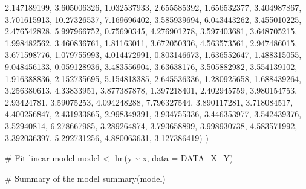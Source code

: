 \documentclass[
  11pt,
]{article}
\newenvironment{Shaded}{\begin{snugshade}}{\end{snugshade}}
\newcommand{\AttributeTok}[1]{\textcolor[rgb]{0.40,0.45,0.13}{#1}}
\newcommand{\CommentTok}[1]{\textcolor[rgb]{0.37,0.37,0.37}{#1}}
\newcommand{\FloatTok}[1]{\textcolor[rgb]{0.68,0.00,0.00}{#1}}
\newcommand{\FunctionTok}[1]{\textcolor[rgb]{0.28,0.35,0.67}{#1}}
\newcommand{\NormalTok}[1]{\textcolor[rgb]{0.00,0.23,0.31}{#1}}
\newcommand{\OtherTok}[1]{\textcolor[rgb]{0.00,0.23,0.31}{#1}}
\newcommand{\SpecialCharTok}[1]{\textcolor[rgb]{0.37,0.37,0.37}{#1}}
\begin{document}
\begin{Shaded}
\begin{Highlighting}[]
        \FloatTok{2.147189199}\NormalTok{, }\FloatTok{3.605006326}\NormalTok{, }\FloatTok{1.032537933}\NormalTok{, }\FloatTok{2.655585392}\NormalTok{, }\FloatTok{1.656532377}\NormalTok{, }\FloatTok{3.404987867}\NormalTok{,}
        \FloatTok{3.701615913}\NormalTok{, }\FloatTok{10.27326537}\NormalTok{, }\FloatTok{7.169696402}\NormalTok{, }\FloatTok{3.585939694}\NormalTok{, }\FloatTok{6.043443262}\NormalTok{, }\FloatTok{3.455010225}\NormalTok{,}
        \FloatTok{2.476542828}\NormalTok{, }\FloatTok{5.997966752}\NormalTok{, }\FloatTok{0.75690345}\NormalTok{, }\FloatTok{4.276901278}\NormalTok{, }\FloatTok{3.597403681}\NormalTok{, }\FloatTok{3.648705215}\NormalTok{,}
        \FloatTok{1.998482562}\NormalTok{, }\FloatTok{3.460836761}\NormalTok{, }\FloatTok{1.81163011}\NormalTok{, }\FloatTok{3.672050336}\NormalTok{, }\FloatTok{4.563573561}\NormalTok{, }\FloatTok{2.947486015}\NormalTok{,}
        \FloatTok{3.671598776}\NormalTok{, }\FloatTok{1.079755993}\NormalTok{, }\FloatTok{4.014472991}\NormalTok{, }\FloatTok{0.803146673}\NormalTok{, }\FloatTok{1.636552647}\NormalTok{, }\FloatTok{1.488315055}\NormalTok{,}
        \FloatTok{9.048456133}\NormalTok{, }\FloatTok{0.059128936}\NormalTok{, }\FloatTok{3.483556904}\NormalTok{, }\FloatTok{3.63638176}\NormalTok{, }\FloatTok{3.505882982}\NormalTok{, }\FloatTok{3.554139102}\NormalTok{,}
        \FloatTok{1.916388836}\NormalTok{, }\FloatTok{2.152735695}\NormalTok{, }\FloatTok{5.154818385}\NormalTok{, }\FloatTok{2.645536336}\NormalTok{, }\FloatTok{1.280925658}\NormalTok{, }\FloatTok{1.688439264}\NormalTok{,}
        \FloatTok{3.256380613}\NormalTok{, }\FloatTok{4.33833951}\NormalTok{, }\FloatTok{3.877387878}\NormalTok{, }\FloatTok{1.397218401}\NormalTok{, }\FloatTok{2.402945759}\NormalTok{, }\FloatTok{3.980154753}\NormalTok{,}
        \FloatTok{2.93424781}\NormalTok{, }\FloatTok{3.59075253}\NormalTok{, }\FloatTok{4.094248288}\NormalTok{, }\FloatTok{7.796327544}\NormalTok{, }\FloatTok{3.890117281}\NormalTok{, }\FloatTok{3.718084517}\NormalTok{,}
        \FloatTok{4.400256847}\NormalTok{, }\FloatTok{2.431933865}\NormalTok{, }\FloatTok{2.998349391}\NormalTok{, }\FloatTok{3.934755336}\NormalTok{, }\FloatTok{3.446353977}\NormalTok{, }\FloatTok{3.542439376}\NormalTok{,}
        \FloatTok{3.52940814}\NormalTok{, }\FloatTok{6.278667985}\NormalTok{, }\FloatTok{3.289264874}\NormalTok{, }\FloatTok{3.793658899}\NormalTok{, }\FloatTok{3.998930738}\NormalTok{, }\FloatTok{4.583571992}\NormalTok{,}
        \FloatTok{3.392036397}\NormalTok{, }\FloatTok{5.292731256}\NormalTok{, }\FloatTok{4.880063631}\NormalTok{, }\FloatTok{3.127386419}\NormalTok{)}
\NormalTok{)}


\CommentTok{\# Fit linear model}
\NormalTok{model }\OtherTok{\textless{}{-}} \FunctionTok{lm}\NormalTok{(y }\SpecialCharTok{\textasciitilde{}}\NormalTok{ x, }\AttributeTok{data =}\NormalTok{ DATA\_X\_Y)}

\CommentTok{\# Summary of the model}
\FunctionTok{summary}\NormalTok{(model)}
\end{Highlighting}
\end{Shaded}
\end{document}
